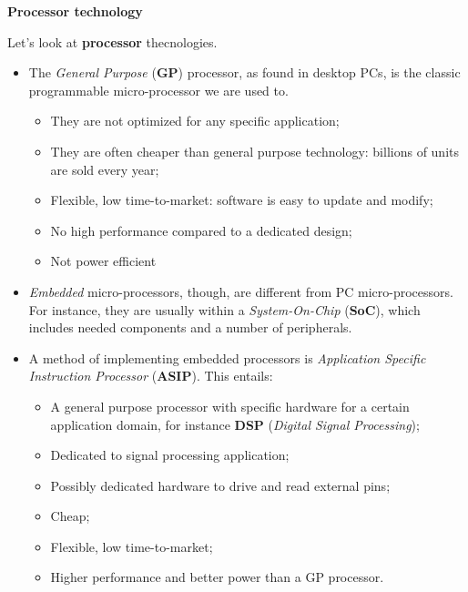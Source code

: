 \documentclass[a4paper,11pt]{article}
\begin{document}
\par\smallskip
\textbf{\textsf{Processor technology}}

Let's look at \textbf{processor} thecnologies.

\begin{itemize}
	\item
	      The \textit{General Purpose} (\textbf{GP}) processor, as found in desktop PCs, is the classic programmable micro-processor we are used to.
	      \begin{itemize}
		      \item They are not optimized for any specific application;
		      \item They are often cheaper than general purpose technology: billions of units are sold every year;
		      \item Flexible, low time-to-market: software is easy to update and modify;
		      \item No high performance compared to a dedicated design;
		      \item Not power efficient
	      \end{itemize}

	\item
	      \textit{Embedded} micro-processors, though, are different from PC micro-processors.
	      For instance, they are usually within a \textit{System-On-Chip} (\textbf{SoC}), which includes needed components and a number of peripherals.

	\item
	      A method of implementing embedded processors is \textit{Application Specific Instruction Processor} (\textbf{ASIP}).
	      This entails:
	      \begin{itemize}
		      \item A general purpose processor with specific hardware for a certain application domain, for instance \textbf{DSP} (\textit{Digital Signal Processing});
		      \item Dedicated to signal processing application;
		      \item Possibly dedicated hardware to drive and read external pins;
		      \item Cheap;
		      \item Flexible, low time-to-market;
		      \item Higher performance and better power than a GP processor.
	      \end{itemize}


\end{itemize}
\end{document}

